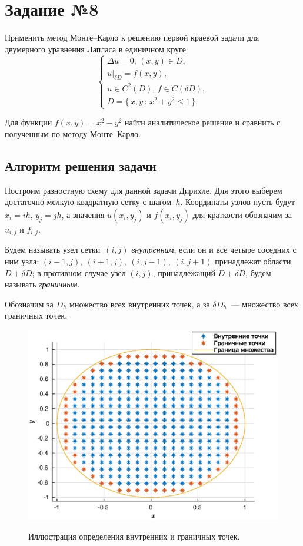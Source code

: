 \section{Задание №8}

Применить метод Монте--Карло к решению первой краевой задачи для двумерного уравнения Лапласа в единичном круге:
$$
        \left\{
\begin{array}{lcr}
        \Delta u=0, \, (x,y)\in D,
\\
        u|_{\delta D}=f(x,y),
\\
        u\in C^2(D), \, f \in C(\delta D),
\\
        D = \{\, x,y \,:\, x^2+y^2 \leqslant 1 \,\}.
\end{array}
        \right.
$$

Для функции $f(x,y)=x^2-y^2$ найти аналитическое решение и сравнить с полученным по методу Монте--Карло.

\subsection{Алгоритм решения задачи}

Построим разностную схему для данной задачи Дирихле. Для этого выберем достаточно мелкую квадратную сетку с шагом~$h$. Координаты узлов пусть будут $x_i = ih$, $y_j = jh$, а значения $u(x_i, y_j)$ и $f(x_i,y_j)$ для краткости обозначим за $u_{i,j}$ и $f_{i,j}$.

\begin{definition}
        Будем называть узел сетки~$(i, j)$ \textit{внутренним}, если он и все четыре соседних с ним узла: $(i-1, j), \ (i + 1, j), \ (i, j - 1), \ (i, j + 1)$ принадлежат области~$D + \delta D$; в противном случае узел $(i, j)$, принадлежащий $D + \delta D$, будем называть \textit{граничным}.

        Обозначим за $D_h$ множество всех внутренних точек, а за $\delta D_h$~--- множество всех граничных точек.
\end{definition}

\begin{figure}[h]\label{img:81}
        \noindent
        \centering
        {
                \includegraphics[width=120mm]{task_08/circle.eps}
        }
        \caption{Иллюстрация определения внутренних и граничных точек.}
\end{figure}

